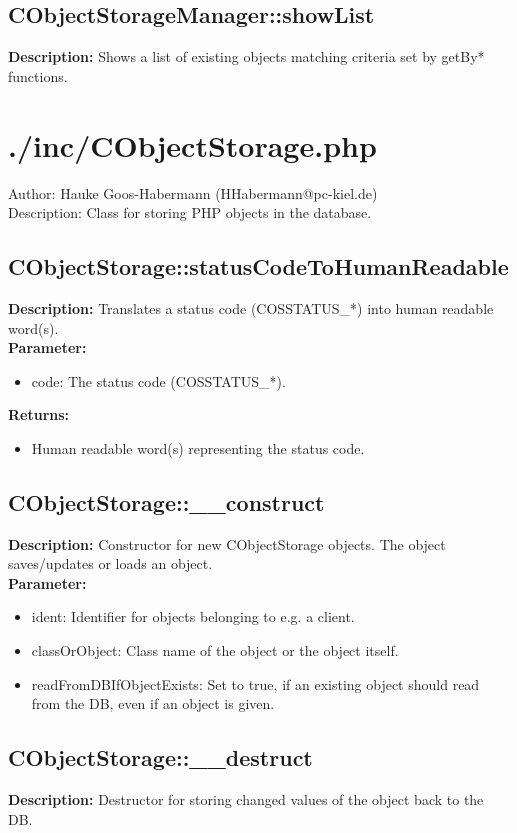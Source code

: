 \subsection{CObjectStorageManager::showList}
\textbf{Description:} Shows a list of existing objects matching criteria set by getBy* functions.\\

\newpage\section{./inc/CObjectStorage.php}
 Author: Hauke Goos-Habermann (HHabermann@pc-kiel.de)\\
 Description: Class for storing PHP objects in the database.\\

\subsection{CObjectStorage::statusCodeToHumanReadable}
\textbf{Description:} Translates a status code (COSSTATUS\_*) into human readable word(s).\\
\textbf{Parameter:}
\begin{itemize}
\item code: The status code (COSSTATUS\_*).
\end{itemize}
\textbf{Returns:}
\begin{itemize}
\item Human readable word(s) representing the status code.
\end{itemize}

\subsection{CObjectStorage::\_\_construct}
\textbf{Description:} Constructor for new CObjectStorage objects. The object saves/updates or loads an object.\\
\textbf{Parameter:}
\begin{itemize}
\item ident: Identifier for objects belonging to e.g. a client.
\item classOrObject: Class name of the object or the object itself.
\item readFromDBIfObjectExists: Set to true, if an existing object should read from the DB, even if an object is given.
\end{itemize}

\subsection{CObjectStorage::\_\_destruct}
\textbf{Description:} Destructor for storing changed values of the object back to the DB.\\

